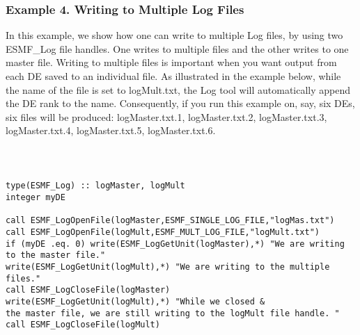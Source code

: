 \subsubsection{Example 4. Writing to Multiple Log Files }

In this example, we show how one can write to multiple Log files,
by using two ESMF\_Log file handles.  One writes to multiple files and the
other writes to one master file. Writing to multiple files is important 
when you want output from each DE saved to an individual file. 
As illustrated in the example below, while the name of the file is set to
logMult.txt, the Log tool will automatically append the DE rank to
the name. Consequently, if you run this example on, say, six
DEs, six files will be produced: logMaster.txt.1, logMaster.txt.2,
logMaster.txt.3, logMaster.txt.4, logMaster.txt.5, logMaster.txt.6.

{\tt
\begin{verbatim}

type(ESMF_Log) :: logMaster, logMult
integer myDE

call ESMF_LogOpenFile(logMaster,ESMF_SINGLE_LOG_FILE,"logMas.txt")
call ESMF_LogOpenFile(logMult,ESMF_MULT_LOG_FILE,"logMult.txt")
if (myDE .eq. 0) write(ESMF_LogGetUnit(logMaster),*) "We are writing to the master file."
write(ESMF_LogGetUnit(logMult),*) "We are writing to the multiple files."
call ESMF_LogCloseFile(logMaster)
write(ESMF_LogGetUnit(logMult),*) "While we closed &
the master file, we are still writing to the logMult file handle. "
call ESMF_LogCloseFile(logMult)

\end{verbatim}
\tt}






